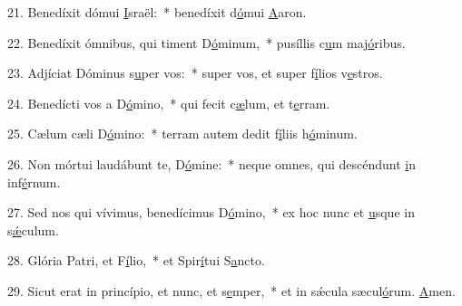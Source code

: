 21. Benedíxit dómui \uline{I}sraël:~* benedíxit d\uline{ó}mui \uline{A}aron.\par 
22. Benedíxit ómnibus, qui timent D\uline{ó}minum,~* pusíllis c\uline{u}m maj\uline{ó}ribus.\par 
23. Adjíciat Dóminus s\uline{u}per vos:~* super vos, et super f\uline{í}lios v\uline{e}stros.\par 
24. Benedícti vos a D\uline{ó}mino,~* qui fecit c\uline{æ}lum, et t\uline{e}rram.\par 
25. Cælum cæli D\uline{ó}mino:~* terram autem dedit f\uline{í}liis h\uline{ó}minum.\par 
26. Non mórtui laudábunt te, D\uline{ó}mine:~* neque omnes, qui descéndunt \uline{i}n inf\uline{é}rnum.\par 
27. Sed nos qui vívimus, benedícimus D\uline{ó}mino,~* ex hoc nunc et \uline{u}sque in s\uline{ǽ}culum.\par 
28. Glória Patri, et F\uline{í}lio,~* et Spir\uline{í}tui S\uline{a}ncto.\par 
29. Sicut erat in princípio, et nunc, et s\uline{e}mper,~* et in sǽcula sæcul\uline{ó}rum. \uline{A}men.\par 
